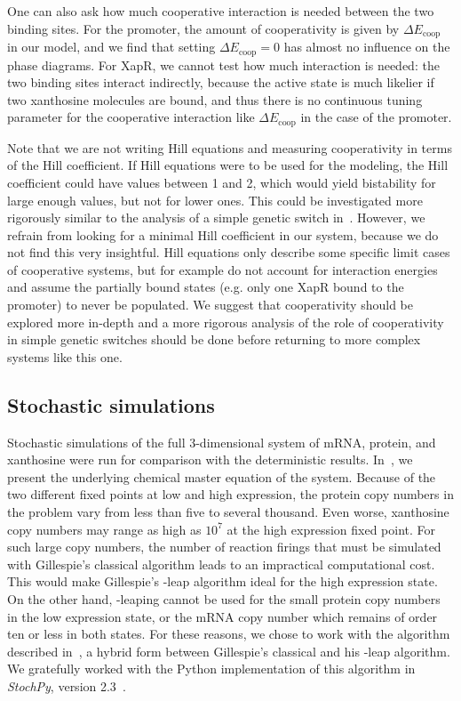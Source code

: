 \documentclass[10pt,letterpaper]{article}
\newcommand{\n}[1]{\mathrm{#1}}
\begin{document}
	One can also ask how much cooperative interaction is needed between the two
	binding sites. For the promoter, the amount of cooperativity is given by $\Delta E_{\n{coop}}$ in
	our model, and we find that setting $\Delta E_{\n{coop}} = 0$ has almost no
	influence on the phase diagrams. For XapR, we cannot test how much interaction is needed: the two binding sites interact
	indirectly, because the active state is much likelier if two xanthosine
	molecules are bound, and thus there is no continuous tuning parameter for the cooperative interaction
	like $\Delta E_{\n{coop}}$ in the case of the promoter.
	
	Note that we are not writing Hill equations and measuring cooperativity in
	terms of the Hill coefficient. If Hill equations were to be used for the
	modeling, the Hill coefficient could have values between 1 and 2, which
	would yield bistability for large enough values, but not for lower ones.
	This could be investigated more rigorously similar to the analysis of a
	simple genetic switch in~\cite{Cherry2000}. However, we refrain from looking
	for a minimal Hill coefficient in our system, because we do not find this
	very insightful. Hill equations only describe some specific limit cases of cooperative systems, but for example do not account for interaction energies and assume the partially bound states (e.g. only one XapR bound to the promoter) to never be populated.
	We suggest that cooperativity should be explored more in-depth and a more
	rigorous analysis of the role of cooperativity in simple genetic switches
	should be done before returning to more complex systems like this one.
	
	\subsection*{Stochastic simulations}
	Stochastic simulations of the full 3-dimensional system of mRNA, protein,
	and xanthosine were run for comparison with the deterministic results.
	In~, we present the underlying chemical master equation of
	the system. Because of the two different fixed points at low and high
	expression, the protein copy numbers in the problem vary from less than
	five to several thousand. Even worse, xanthosine copy numbers may range
	as high as $10^7$ at the high expression fixed point. For such large
	copy numbers, the number of reaction firings that must be simulated with
	Gillespie's classical algorithm leads to an impractical computational
	cost. This would make Gillespie's \texttau-leap algorithm ideal for the high
	expression state. On the other hand, \texttau-leaping cannot be used for
	the small protein copy numbers in the low expression state, or the mRNA
	copy number which remains of order ten or less in both states. For
	these reasons, we chose to work with the algorithm described
	in~\cite{Cao2006}, a hybrid form between Gillespie's classical and his
	\texttau-leap algorithm. We gratefully worked with the Python implementation
	of this algorithm in \emph{StochPy}, version 2.3~\cite{Maarleveld2015}.
	
\end{document}
